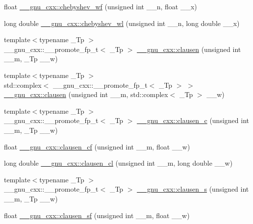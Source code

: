 \begin{DoxyCompactItemize}
float \hyperlink{group__gnu__math__spec__func_gae6d468cee53df584e40afe294127b090}{\+\_\+\+\_\+gnu\+\_\+cxx\+::chebyshev\+\_\+wf} (unsigned int \+\_\+\+\_\+n, float \+\_\+\+\_\+x)
\item 
long double \hyperlink{group__gnu__math__spec__func_ga1297dfd9b9a0f584435de7d83eb9e9c3}{\+\_\+\+\_\+gnu\+\_\+cxx\+::chebyshev\+\_\+wl} (unsigned int \+\_\+\+\_\+n, long double \+\_\+\+\_\+x)
\item 
{\footnotesize template$<$typename \+\_\+\+Tp $>$ }\\\+\_\+\+\_\+gnu\+\_\+cxx\+::\+\_\+\+\_\+promote\+\_\+fp\+\_\+t$<$ \+\_\+\+Tp $>$ \hyperlink{group__gnu__math__spec__func_ga7959ce3dea7f8d98b1dfee5715303f1c}{\+\_\+\+\_\+gnu\+\_\+cxx\+::clausen} (unsigned int \+\_\+\+\_\+m, \+\_\+\+Tp \+\_\+\+\_\+w)
\item 
{\footnotesize template$<$typename \+\_\+\+Tp $>$ }\\std\+::complex$<$ \+\_\+\+\_\+gnu\+\_\+cxx\+::\+\_\+\+\_\+promote\+\_\+fp\+\_\+t$<$ \+\_\+\+Tp $>$ $>$ \hyperlink{group__gnu__math__spec__func_ga4ffe44c8ee15518ac2577ba0aa94a99c}{\+\_\+\+\_\+gnu\+\_\+cxx\+::clausen} (unsigned int \+\_\+\+\_\+m, std\+::complex$<$ \+\_\+\+Tp $>$ \+\_\+\+\_\+w)
\item 
{\footnotesize template$<$typename \+\_\+\+Tp $>$ }\\\+\_\+\+\_\+gnu\+\_\+cxx\+::\+\_\+\+\_\+promote\+\_\+fp\+\_\+t$<$ \+\_\+\+Tp $>$ \hyperlink{group__gnu__math__spec__func_gabbdae75b253a0b19e8ae3d42c14f6be3}{\+\_\+\+\_\+gnu\+\_\+cxx\+::clausen\+\_\+c} (unsigned int \+\_\+\+\_\+m, \+\_\+\+Tp \+\_\+\+\_\+w)
\item 
float \hyperlink{group__gnu__math__spec__func_ga515b9b6bca8f97e696ac5be85a44b3bd}{\+\_\+\+\_\+gnu\+\_\+cxx\+::clausen\+\_\+cf} (unsigned int \+\_\+\+\_\+m, float \+\_\+\+\_\+w)
\item 
long double \hyperlink{group__gnu__math__spec__func_ga5ff89833dc529ca3de5099e1b9c8525f}{\+\_\+\+\_\+gnu\+\_\+cxx\+::clausen\+\_\+cl} (unsigned int \+\_\+\+\_\+m, long double \+\_\+\+\_\+w)
\item 
{\footnotesize template$<$typename \+\_\+\+Tp $>$ }\\\+\_\+\+\_\+gnu\+\_\+cxx\+::\+\_\+\+\_\+promote\+\_\+fp\+\_\+t$<$ \+\_\+\+Tp $>$ \hyperlink{group__gnu__math__spec__func_ga3ed0e444799410cda76ccbc62181ce0c}{\+\_\+\+\_\+gnu\+\_\+cxx\+::clausen\+\_\+s} (unsigned int \+\_\+\+\_\+m, \+\_\+\+Tp \+\_\+\+\_\+w)
\item 
float \hyperlink{group__gnu__math__spec__func_ga2308b5828b5a8003d16cfa0f90826f94}{\+\_\+\+\_\+gnu\+\_\+cxx\+::clausen\+\_\+sf} (unsigned int \+\_\+\+\_\+m, float \+\_\+\+\_\+w)

\end{DoxyCompactItemize}
